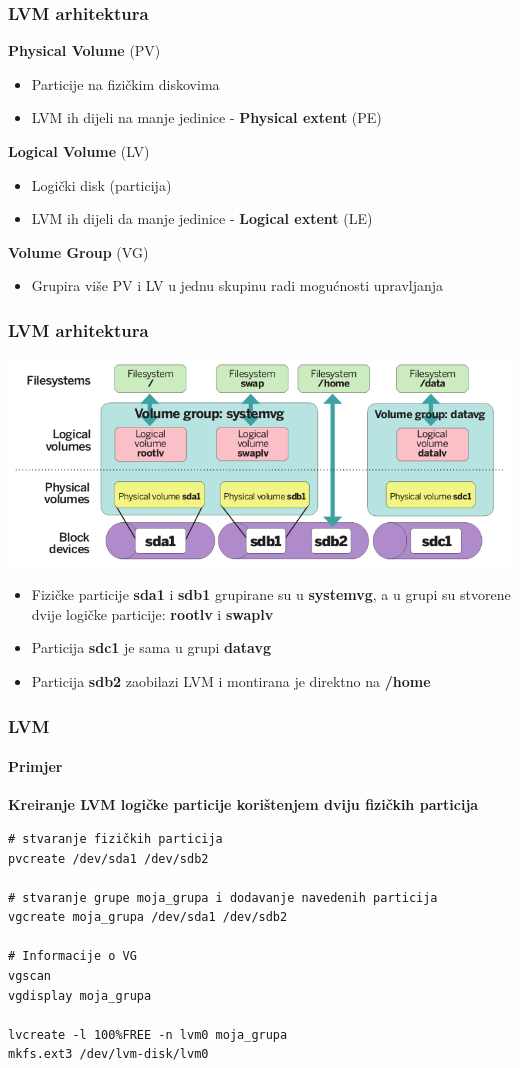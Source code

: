 \documentclass[t]{beamer}
\begin{document}
\begin{frame}
	\frametitle{LVM arhitektura}
	\textbf{Physical Volume} (PV)
	\begin{itemize}
		\item Particije na fizičkim diskovima
		\item LVM ih dijeli na manje jedinice - \textbf{Physical extent} (PE)
	\end{itemize}
	\vfill
	\textbf{Logical Volume} (LV)
	\begin{itemize}
		\item Logički disk (particija)
		\item LVM ih dijeli da manje jedinice - \textbf{Logical extent} (LE)
	\end{itemize}
	\vfill
	\textbf{Volume Group} (VG)
	\begin{itemize}
		\item Grupira više PV i LV u jednu skupinu radi mogućnosti upravljanja
	\end{itemize}
	\textbf{}
\end{frame}

\begin{frame}
	\frametitle{LVM arhitektura}
	\includegraphics[width=\textwidth]{lvm_arch.png}
	\vfill
	\begin{itemize}
		\item Fizičke particije \textbf{sda1} i \textbf{sdb1} grupirane su u \textbf{systemvg}, a u grupi su stvorene dvije logičke particije: \textbf{rootlv} i \textbf{swaplv}
		\item Particija \textbf{sdc1} je sama u grupi \textbf{datavg}
		\item Particija \textbf{sdb2} zaobilazi LVM i montirana je direktno na \textbf{/home}
	\end{itemize}
\end{frame}

\begin{frame}[fragile]
	\frametitle{LVM}
	\framesubtitle{Primjer}
	\textbf{Kreiranje LVM logičke particije korištenjem dviju fizičkih particija}\\
	\begin{verbatim}
# stvaranje fizičkih particija
pvcreate /dev/sda1 /dev/sdb2 

# stvaranje grupe moja_grupa i dodavanje navedenih particija
vgcreate moja_grupa /dev/sda1 /dev/sdb2 

# Informacije o VG
vgscan
vgdisplay moja_grupa

lvcreate -l 100%FREE -n lvm0 moja_grupa
mkfs.ext3 /dev/lvm-disk/lvm0
	\end{verbatim}
\end{frame}
\end{document}
